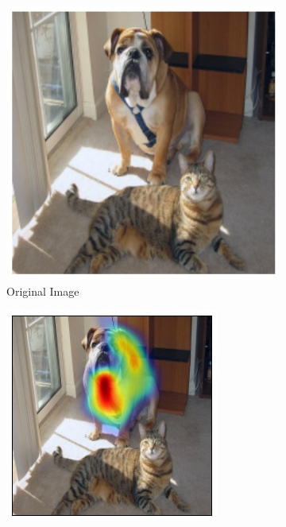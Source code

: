 \begin{figure}[ht!]
    \centering \begin{subfigure}[t]{0.158\textwidth} \centering
        \includegraphics[width=\textwidth]{figures/teaser/original.jpg}
        \caption{\scriptsize{Original Image}}
	\end{subfigure}
	\begin{subfigure}[t]{0.158\textwidth}
        \centering
        \includegraphics[width=\textwidth]{figures/cat_neg_exp.jpg}

\end{subfigure}
\end{figure}
